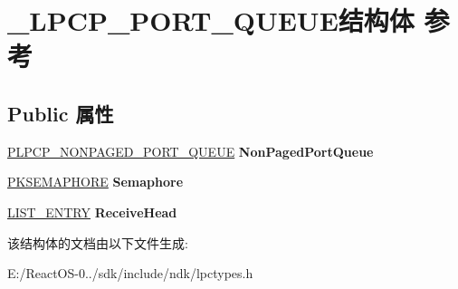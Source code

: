 \hypertarget{struct___l_p_c_p___p_o_r_t___q_u_e_u_e}{}\section{\+\_\+\+L\+P\+C\+P\+\_\+\+P\+O\+R\+T\+\_\+\+Q\+U\+E\+U\+E结构体 参考}
\label{struct___l_p_c_p___p_o_r_t___q_u_e_u_e}
\subsection*{Public 属性}
\begin{DoxyCompactItemize}
\item 
\mbox{\label{struct___l_p_c_p___p_o_r_t___q_u_e_u_e_a006600c05794d4841ee5ae5e262e467d}} 
\hyperlink{struct___l_p_c_p___n_o_n_p_a_g_e_d___p_o_r_t___q_u_e_u_e}{P\+L\+P\+C\+P\+\_\+\+N\+O\+N\+P\+A\+G\+E\+D\+\_\+\+P\+O\+R\+T\+\_\+\+Q\+U\+E\+UE} {\bfseries Non\+Paged\+Port\+Queue}
\item 
\mbox{\label{struct___l_p_c_p___p_o_r_t___q_u_e_u_e_abfaf760618d249c6a674efb082dfe6fc}} 
\hyperlink{struct___k_s_e_m_a_p_h_o_r_e}{P\+K\+S\+E\+M\+A\+P\+H\+O\+RE} {\bfseries Semaphore}
\item 
\mbox{\label{struct___l_p_c_p___p_o_r_t___q_u_e_u_e_a1e85f324d779096baa0d26a1547f6c02}} 
\hyperlink{struct___l_i_s_t___e_n_t_r_y}{L\+I\+S\+T\+\_\+\+E\+N\+T\+RY} {\bfseries Receive\+Head}
\end{DoxyCompactItemize}


该结构体的文档由以下文件生成\+:\begin{DoxyCompactItemize}
\item 
E\+:/\+React\+O\+S-\/0../sdk/include/ndk/lpctypes.\+h\end{DoxyCompactItemize}
